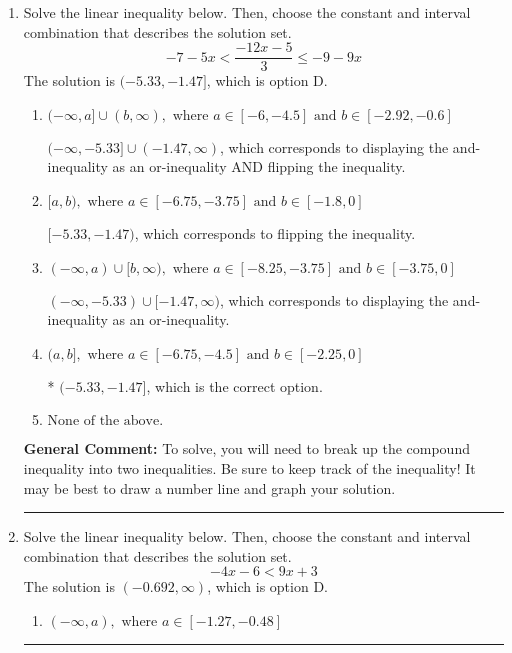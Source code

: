 \documentclass{extbook}[14pt]
\newcommand{\litem}[1]{\item #1

\rule{\textwidth}{0.4pt}}
\begin{document}
\begin{enumerate}
{\begin{enumerate}[label=\Alph*.]
* $[-0.364, \infty)$, which is the correct option.
\item \( \text{None of the above}. \)

You may have chosen this if you thought the inequality did not match the ends of the intervals.
\end{enumerate}

\textbf{General Comment:} Remember that less/greater than or equal to includes the endpoint, while less/greater do not. Also, remember that you need to flip the inequality when you multiply or divide by a negative.
}
\litem{
Solve the linear inequality below. Then, choose the constant and interval combination that describes the solution set.
\[ -7 - 5 x < \frac{-12 x - 5}{3} \leq -9 - 9 x \]The solution is \( (-5.33, -1.47] \), which is option D.\begin{enumerate}[label=\Alph*.]
\item \( (-\infty, a] \cup (b, \infty), \text{ where } a \in [-6, -4.5] \text{ and } b \in [-2.92, -0.6] \)

$(-\infty, -5.33] \cup (-1.47, \infty)$, which corresponds to displaying the and-inequality as an or-inequality AND flipping the inequality.
\item \( [a, b), \text{ where } a \in [-6.75, -3.75] \text{ and } b \in [-1.8, 0] \)

$[-5.33, -1.47)$, which corresponds to flipping the inequality.
\item \( (-\infty, a) \cup [b, \infty), \text{ where } a \in [-8.25, -3.75] \text{ and } b \in [-3.75, 0] \)

$(-\infty, -5.33) \cup [-1.47, \infty)$, which corresponds to displaying the and-inequality as an or-inequality.
\item \( (a, b], \text{ where } a \in [-6.75, -4.5] \text{ and } b \in [-2.25, 0] \)

* $(-5.33, -1.47]$, which is the correct option.
\item \( \text{None of the above.} \)


\end{enumerate}

\textbf{General Comment:} To solve, you will need to break up the compound inequality into two inequalities. Be sure to keep track of the inequality! It may be best to draw a number line and graph your solution.
}
\litem{
Solve the linear inequality below. Then, choose the constant and interval combination that describes the solution set.
\[ -4x -6 < 9x + 3 \]The solution is \( (-0.692, \infty) \), which is option D.\begin{enumerate}[label=\Alph*.]
\item \( (-\infty, a), \text{ where } a \in [-1.27, -0.48] \)


\end{enumerate}}
\end{enumerate}
\end{document}
